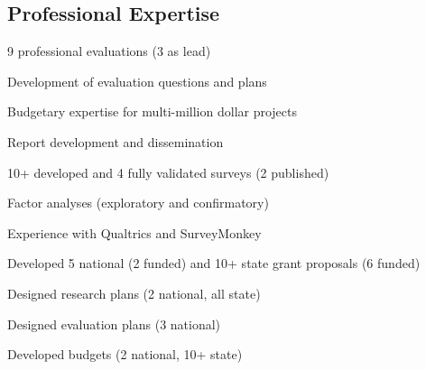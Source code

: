 \subsection{Professional Expertise}
    \begin{cvtable}
            {\color{cvsectioncolor}{Evaluation Planning and Implementation}}
            {}
            {\begin{tightitemize}
                \item 9 professional evaluations (3 as lead)
                \item Development of evaluation questions and plans
                \item Budgetary expertise for multi-million dollar projects
                \item Report development and dissemination 
            \end{tightitemize}}
        \cvitem{}
            {\color{cvsectioncolor}{Survey Development and Validation}}
            {}
            {\begin{tightitemize}
                \item 10+ developed and 4 fully validated surveys (2 published)
                \item Factor analyses (exploratory and confirmatory)
                \item Experience with Qualtrics and SurveyMonkey
            \end{tightitemize}}
            {\color{cvsectioncolor}{Grant Proposal Development}}
            {}
            {\begin{tightitemize}
                \item Developed 5 national (2 funded) and 10+ state grant proposals (6 funded)
                \item Designed research plans (2 national, all state)
                \item Designed evaluation plans (3 national)
                \item Developed budgets (2 national, 10+ state)
            \end{tightitemize}}
    \end{cvtable}